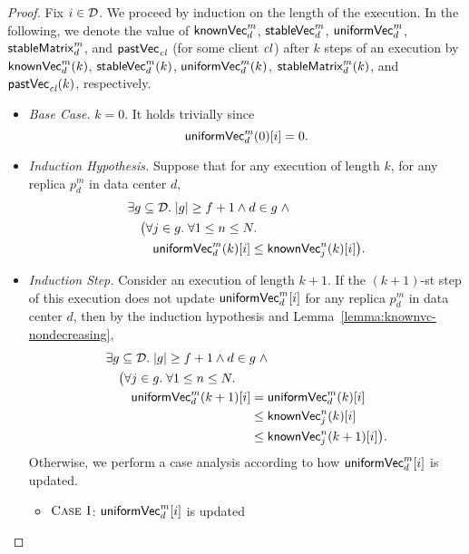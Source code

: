 \begin{proof} \label{proof:uniformvc-knownvc-f+1}
  Fix $i \in \mathcal{D}$.
  We proceed by induction on the length of the execution.
  In the following, we denote the value of
  ${\sf knownVec}^{m}_{d}$, ${\sf stableVec}^{m}_{d}$, ${\sf uniformVec}^{m}_{d}$,
  ${\sf stableMatrix}^{m}_{d}$, and ${\sf pastVec}_{\mathit{cl}}$ (for some client $\mathit{cl}$)
  after $k$ steps of an execution by
  ${\sf knownVec}^{m}_{d}(k)$, ${\sf stableVec}^{m}_{d}(k)$, ${\sf uniformVec}^{m}_{d}(k)$,
  ${\sf stableMatrix}^{m}_{d}(k)$, and ${\sf pastVec}_{\mathit{cl}}(k)$, respectively.
  \begin{itemize}
    \item {\it Base Case.} $k = 0$. It holds trivially since
      \[
        {\sf uniformVec}^{m}_{d}(0)[i] = 0.
      \]
    \item {\it Induction Hypothesis.}
      Suppose that for any execution of length $k$,
      for any replica $p^{m}_{d}$ in data center $d$,
      \begin{align*}
        &\exists g \subseteq \mathcal{D}.\; |g| \ge f + 1 \land d \in g\; \land \\
          &\quad \big(\forall j \in g.\; \forall 1 \le n \le N.\; \\
            &\qquad {\sf uniformVec}^{m}_{d}(k)[i] \le {\sf knownVec}^{n}_{j}(k)[i] \big).
      \end{align*}
    \item {\it Induction Step.}
      Consider an execution of length $k + 1$.
      If the $(k+1)$-st step of this execution does not update
      ${\sf uniformVec}^{m}_{d}[i]$ for any replica $p^{m}_{d}$ in data center $d$,
      then by the induction hypothesis and Lemma~\ref{lemma:knownvc-nondecreasing},
      \begin{align*}
        &\exists g \subseteq \D.\; |g| \ge f + 1 \land d \in g\; \land \\
          &\quad \big(\forall j \in g.\; \forall 1 \le n \le N.\; \\
            &\qquad \uniformVC^{m}_{d}(k + 1)[i] = \uniformVC^{m}_{d}(k)[i] \\
            &\phantom{\qquad \uniformVC^{m}_{d}(k + 1)[i]}
              \le \knownVC^{n}_{j}(k)[i] \\
            &\phantom{\qquad \uniformVC^{m}_{d}(k + 1)[i]}
              \le \knownVC^{n}_{j}(k + 1)[i] \big).
      \end{align*}
      Otherwise, we perform a case analysis
      according to how ${\sf uniformVec}^{m}_{d}[i]$ is updated.
      \begin{itemize}
        \item $\textsc{Case I}$: ${\sf uniformVec}^{m}_{d}[i]$ is updated

\end{itemize}
\end{itemize}
\end{proof}
